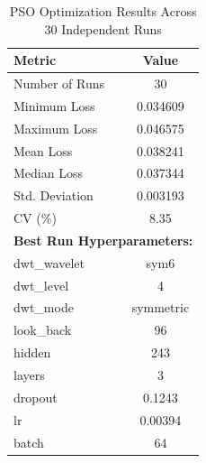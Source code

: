 \begin{table}[htbp]
\centering
\caption{PSO Optimization Results Across 30 Independent Runs}
\label{tab:pso_results}
\begin{tabular}{lc}
\hline
\textbf{Metric} & \textbf{Value} \\
\hline
Number of Runs & 30 \\
Minimum Loss   & 0.034609 \\
Maximum Loss   & 0.046575 \\
Mean Loss      & 0.038241 \\
Median Loss    & 0.037344 \\
Std. Deviation & 0.003193 \\
CV (\%)       & 8.35 \\
\hline
\multicolumn{2}{l}{\textbf{Best Run Hyperparameters:}} \\
dwt\_wavelet   & sym6 \\
dwt\_level     & 4 \\
dwt\_mode      & symmetric \\
look\_back     & 96 \\
hidden         & 243 \\
layers         & 3 \\
dropout        & 0.1243 \\
lr             & 0.00394 \\
batch          & 64 \\
\hline
\end{tabular}
\end{table}

